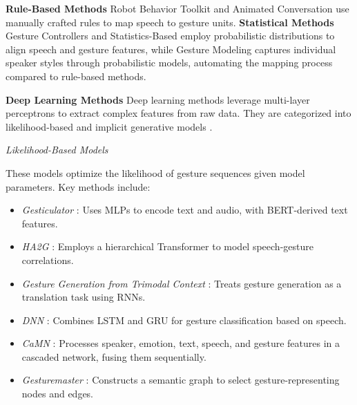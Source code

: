 \textbf{Rule-Based Methods}
Robot Behavior Toolkit \citep{huang2012robot} and Animated Conversation \citep{cassell1994animated} use manually crafted rules to map speech to gesture units. \textbf{Statistical Methods}
Gesture Controllers \citep{levine2010gesture} and Statistics-Based \citep{yang2020statistics} employ probabilistic distributions to align speech and gesture features, while Gesture Modeling \citep{neff2008gesture} captures individual speaker styles through probabilistic models, automating the mapping process compared to rule-based methods.

\textbf{Deep Learning Methods}
Deep learning methods leverage multi-layer perceptrons to extract complex features from raw data. They are categorized into likelihood-based and implicit generative models \citep{song2021score}.

\textit{Likelihood-Based Models}

These models optimize the likelihood of gesture sequences given model parameters. Key methods include:
\begin{itemize}
	\item \textit{Gesticulator} \citep{kucherenko2020gesticulator}: Uses MLPs to encode text and audio, with BERT-derived text features.
	\item \textit{HA2G} \citep{liu2022learning}: Employs a hierarchical Transformer to model speech-gesture correlations.
	\item \textit{Gesture Generation from Trimodal Context} \citep{yoon2020speech}: Treats gesture generation as a translation task using RNNs.
	\item \textit{DNN} \citep{chiu2015predicting}: Combines LSTM and GRU for gesture classification based on speech.
	\item \textit{CaMN} \citep{liu2022beat}: Processes speaker, emotion, text, speech, and gesture features in a cascaded network, fusing them sequentially.
	\item \textit{Gesturemaster} \citep{zhou2022gesturemaster}: Constructs a semantic graph to select gesture-representing nodes and edges.
\end{itemize}


